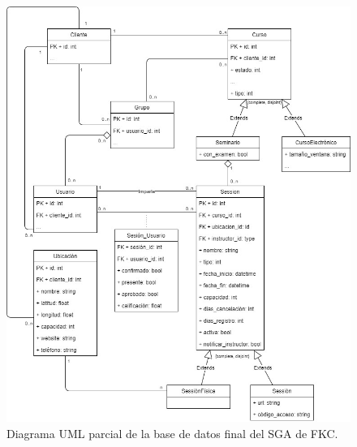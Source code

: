 \begin{figure}[t]
	\begin{center}
		\includegraphics[width=\textwidth]{figuras/database.jpg}
		\caption{Diagrama UML parcial de la base de datos final del SGA de FKC.} \label{fig:baseDeDatosFinal}
	\end{center}
\end{figure}


